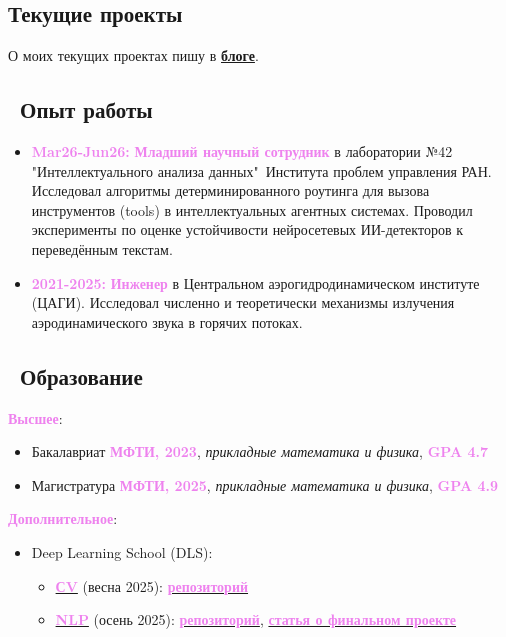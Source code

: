 \documentclass[a4paper,12pt]{article}
\begin{document}
	\subsection*{Текущие проекты}
	О моих текущих проектах пишу в \href{https://petrovortex.github.io/}{\textbf{блоге}}.
	
	\subsection*{\faBriefcase\ Опыт работы}
	\begin{itemize}
		\item \textcolor{violet}{\textbf{Mar26-Jun26:}} \textcolor{violet}{\textbf{Младший научный сотрудник}} в лаборатории №42 "Интеллектуального анализа данных"\ Института проблем управления РАН. Исследовал алгоритмы детерминированного роутинга для вызова инструментов (tools) в интеллектуальных агентных системах. Проводил эксперименты по оценке устойчивости нейросетевых ИИ-детекторов к переведённым текстам.
		\item \textcolor{violet}{\textbf{2021-2025:}} \textcolor{violet}{\textbf{Инженер}} в Центральном аэрогидродинамическом институте (ЦАГИ). Исследовал численно и теоретически механизмы излучения аэродинамического звука в горячих потоках.
	\end{itemize}
	
	\subsection*{\faGraduationCap\ Образование}
	\textcolor{violet}{\textbf{Высшее}}: 
	\begin{itemize}
		\item Бакалавриат \textcolor{violet}{\textbf{МФТИ, 2023}}, \textit{прикладные математика и физика}, \textcolor{violet}{\textbf{GPA 4.7}}
		\item Магистратура \textcolor{violet}{\textbf{МФТИ, 2025}}, \textit{прикладные математика и физика}, \textcolor{violet}{\textbf{GPA 4.9}}
	\end{itemize}
	
	\textcolor{violet}{\textbf{Дополнительное}}:
	\begin{itemize}
		\item Deep Learning School (DLS):
		\begin{itemize}
			\item \href{https://stepik.org/course/230362/syllabus}{\textcolor{violet}{\textbf{СV}}} (весна 2025): \href{https://github.com/petrovortex/dls-homework-sem-1}{\textcolor{violet}{\textbf{репозиторий}}}
			\item \href{https://stepik.org/course/251729/syllabus}{\textcolor{violet}{\textbf{NLP}}} (осень 2025): \href{https://github.com/petrovortex/dls-homework-sem-2}{\textcolor{violet}{\textbf{репозиторий}}}, \href{https://petrovortex.github.io/dls-agent-ru/}{\textcolor{violet}{\textbf{статья о финальном проекте}}}
		\end{itemize}
	\end{itemize} 
	
\end{document}
